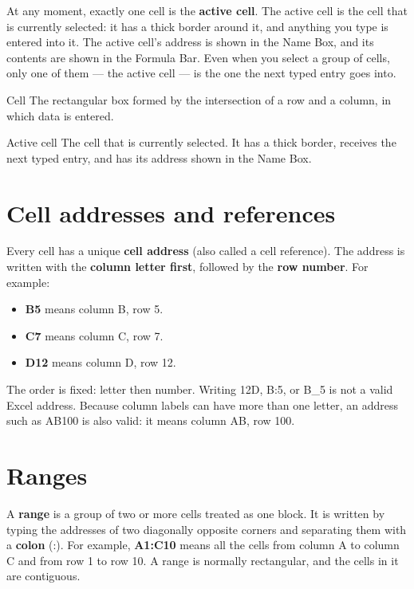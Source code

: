 At any moment, exactly one cell is the \textbf{active cell}. The active cell
is the cell that is currently selected: it has a thick border around it, and
anything you type is entered into it. The active cell's address is shown in
the Name Box, and its contents are shown in the Formula Bar. Even when you
select a group of cells, only one of them --- the active cell --- is the one
the next typed entry goes into.

\begin{definitionbox}{Cell}
The rectangular box formed by the intersection of a row and a column, in
which data is entered.
\end{definitionbox}

\begin{definitionbox}{Active cell}
The cell that is currently selected. It has a thick border, receives the
next typed entry, and has its address shown in the Name Box.
\end{definitionbox}

\section{Cell addresses and references}
Every cell has a unique \textbf{cell address} (also called a cell
reference). The address is written with the \textbf{column letter first},
followed by the \textbf{row number}. For example:

\begin{itemize}
  \item \textbf{B5} means column B, row 5.
  \item \textbf{C7} means column C, row 7.
  \item \textbf{D12} means column D, row 12.
\end{itemize}

The order is fixed: letter then number. Writing 12D, B:5, or B\_5 is not a
valid Excel address. Because column labels can have more than one letter, an
address such as AB100 is also valid: it means column AB, row 100.

\section{Ranges}
A \textbf{range} is a group of two or more cells treated as one block. It is
written by typing the addresses of two diagonally opposite corners and
separating them with a \textbf{colon} (:). For example, \textbf{A1:C10}
means all the cells from column A to column C and from row 1 to row 10. A
range is normally rectangular, and the cells in it are contiguous.

